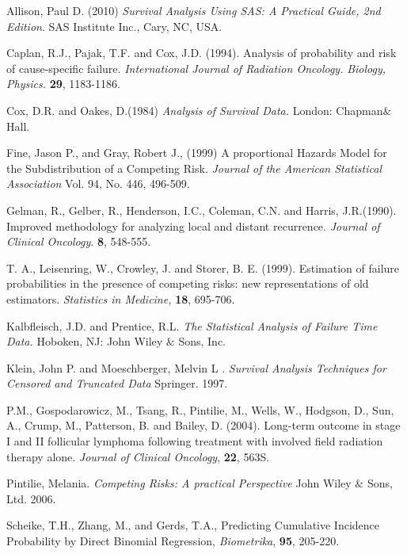 \documentclass[times, doublespace]{simauth}
\begin{document}
\begin{thebibliography}{9}
Allison, Paul D. (2010) \emph{Survival Analysis Using SAS: A Practical Guide, 2nd Edition}. SAS Institute Inc., Cary, NC, USA.

Caplan, R.J., Pajak, T.F. and Cox, J.D. (1994). Analysis of probability and risk of cause-specific failure. \emph{International Journal of Radiation Oncology.} \emph{Biology, Physics.} {\bf 29}, 1183-1186.

Cox, D.R. and Oakes, D.(1984) \emph{Analysis of Survival Data.} London: Chapman$\&$ Hall.

Fine, Jason P., and Gray, Robert J., (1999) A proportional Hazards Model for the Subdistribution of a Competing Risk. \emph{Journal of the American Statistical Association} Vol. 94, No. 446,  496-509.

 Gelman, R., Gelber, R., Henderson, I.C., Coleman, C.N. and Harris, J.R.(1990). Improved methodology for analyzing local and distant recurrence. \emph{Journal of Clinical Oncology}. {\bf 8}, 548-555.

 T. A., Leisenring, W., Crowley, J. and Storer, B. E. (1999). Estimation of failure probabilities in the presence of competing risks: new representations of old estimators. \emph{Statistics in Medicine, }{\bf 18}, 695-706.

 Kalbfleisch, J.D. and Prentice, R.L. \emph{The Statistical Analysis of Failure Time Data.} Hoboken, NJ: John Wiley $\&$ Sons, Inc.

 Klein, John P. and Moeschberger, Melvin L . \emph{Survival Analysis Techniques for Censored and Truncated Data} Springer. 1997.

 P.M., Gospodarowicz, M., Tsang, R., Pintilie, M., Wells, W., Hodgson, D., Sun, A., Crump, M., Patterson, B. and Bailey, D. (2004). Long-term outcome in stage I and II follicular lymphoma following treatment with involved field radiation therapy alone. \emph{Journal of Clinical Oncology}, {\bf 22}, 563S.

 Pintilie, Melania. \emph{Competing Risks: A practical Perspective} John Wiley $\&$ Sons, Ltd. 2006.

Scheike, T.H., Zhang, M., and Gerds, T.A., Predicting Cumulative Incidence Probability by Direct Binomial Regression, \emph{Biometrika}, {\bf 95}, 205-220.

\end{thebibliography}
%
%
\appendix
%
\end{document}
